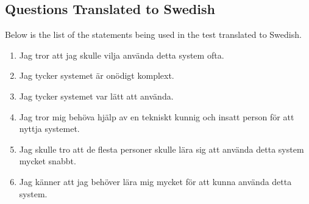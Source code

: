 \documentclass{article}
\begin{document}
	\clearpage
	\begin{appendices}
		\section{Questions Translated to Swedish}
		Below is the list of the statements being used in the test translated to Swedish. 
		\begin{enumerate}
			\item Jag tror att jag skulle vilja använda detta system ofta.
			\item Jag tycker systemet är onödigt komplext.
			\item Jag tycker systemet var lätt att använda.
			\item Jag tror mig behöva hjälp av en tekniskt kunnig och insatt person för att nyttja systemet. 
			\item Jag skulle tro att de flesta personer skulle lära sig att använda detta system mycket snabbt.
			\item Jag känner att jag behöver lära mig mycket för att kunna använda detta system.
		\end{enumerate}
	\end{appendices}
	
	
\end{document}
